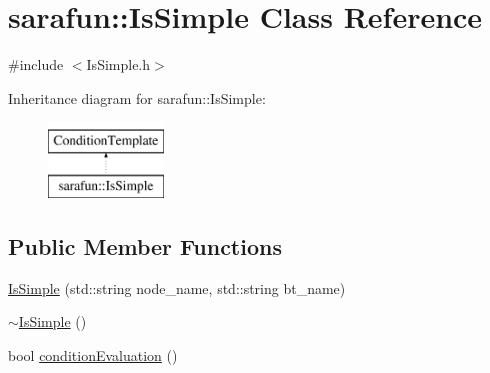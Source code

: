 \hypertarget{classsarafun_1_1IsSimple}{\section{sarafun\-:\-:Is\-Simple Class Reference}
\label{classsarafun_1_1IsSimple}
}


{\ttfamily \#include $<$Is\-Simple.\-h$>$}

Inheritance diagram for sarafun\-:\-:Is\-Simple\-:\begin{figure}[H]
\begin{center}
\leavevmode
\includegraphics[height=2.000000cm]{classsarafun_1_1IsSimple}
\end{center}
\end{figure}
\subsection*{Public Member Functions}
\begin{DoxyCompactItemize}
\item 
\hyperlink{classsarafun_1_1IsSimple_a299c558037426826c95bfc54dbe1a399}{Is\-Simple} (std\-::string node\-\_\-name, std\-::string bt\-\_\-name)
\item 
\hyperlink{classsarafun_1_1IsSimple_a90b55180452143b098bfa0f5a184ee58}{$\sim$\-Is\-Simple} ()
\item 
bool \hyperlink{classsarafun_1_1IsSimple_aa57bb3baf9d3ac955e5fdfd5351d45a0}{condition\-Evaluation} ()
\end{DoxyCompactItemize}


